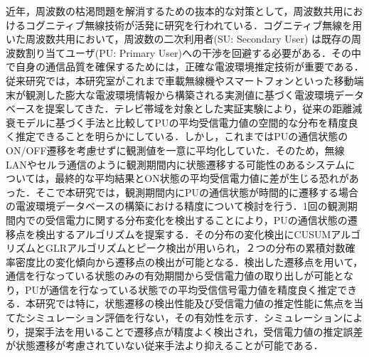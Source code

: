 {}
\begin{jabstract}
近年，周波数の枯渇問題を解消するための抜本的な対策として，周波数共用におけるコグニティブ無線技術が活発に研究を行われている．コグニティブ無線を用いた周波数共用において，周波数の二次利用者(SU: Secondary User) は既存の周波数割り当てユーザ(PU: Primary User)への干渉を回避する必要がある．その中で自身の通信品質を確保するためには，正確な電波環境推定技術が重要である．従来研究では，本研究室がこれまで車載無線機やスマートフォンといった移動端末が観測した膨大な電波環境情報から構築される実測値に基づく電波環境データベースを提案してきた．テレビ帯域を対象とした実証実験により，従来の距離減衰モデルに基づく手法と比較してPUの平均受信電力値の空間的な分布を精度良く推定できることを明らかにしている．しかし，これまではPUの通信状態のON/OFF遷移を考慮せずに観測値を一意に平均化していた．そのため，無線LANやセルラ通信のように観測期間内に状態遷移する可能性のあるシステムについては，最終的な平均結果とON状態の平均受信電力値に差が生じる恐れがあった．そこで本研究では，観測期間内にPUの通信状態が時間的に遷移する場合の電波環境データベースの構築における精度について検討を行う．1回の観測期間内での受信電力に関する分布変化を検出することにより，PUの通信状態の遷移点を検出するアルゴリズムを提案する．その分布の変化検出にCUSUMアルゴリズムとGLRアルゴリズムとピーク検出が用いられ，２つの分布の累積対数確率密度比の変化傾向から遷移点の検出が可能となる．検出した遷移点を用いて，通信を行なっている状態のみの有効期間から受信電力値の取り出しが可能となり，PUが通信を行なっている状態での平均受信信号電力値を精度良く推定できる．本研究では特に，状態遷移の検出性能及び受信電力値の推定性能に焦点を当てたシミュレーション評価を行ない，その有効性を示す．シミュレーションにより，提案手法を用いることで遷移点が精度よく検出され，受信電力値の推定誤差が状態遷移が考慮されていない従来手法より抑えることが可能である．
\end{jabstract}
%
%
%
